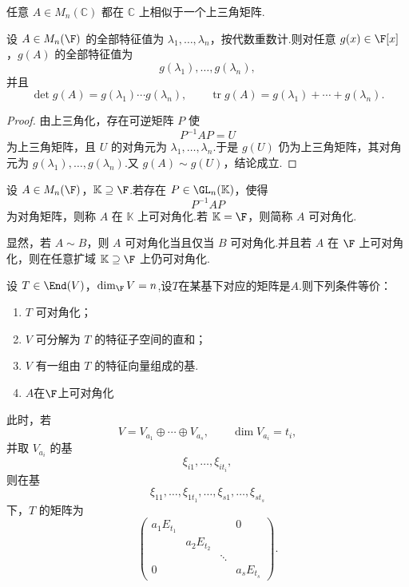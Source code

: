 \begin{corollary}\label{相似于一个上三角矩阵.}
	任意 $A\in M_n(\mathbb C)$ 都在 $\mathbb C$ 上相似于一个上三角矩阵.
\end{corollary}

\begin{corollary}
	设 $A\in M_n(\F)$ 的全部特征值为 $\lambda_1,\ldots,\lambda_n$，按代数重数计.则对任意 $g(x)\in\F[x]$，$g(A)$ 的全部特征值为
	\[
	g(\lambda_1),\ldots,g(\lambda_n),
	\]
	并且
	\[
	\det g(A)=g(\lambda_1)\cdots g(\lambda_n),
	\qquad
	\operatorname{tr} g(A)=g(\lambda_1)+\cdots+g(\lambda_n).
	\]
\end{corollary}

\begin{proof}
	由上三角化，存在可逆矩阵 $P$ 使
	\[
	P^{-1}AP=U
	\]
	为上三角矩阵，且 $U$ 的对角元为 $\lambda_1,\ldots,\lambda_n$.于是 $g(U)$ 仍为上三角矩阵，其对角元为 $g(\lambda_1),\ldots,g(\lambda_n)$.又 $g(A)\sim g(U)$，结论成立.
\end{proof}

\begin{definition}
	设 $A\in M_n(\F)$，$\mathbb K\supseteq\F$.若存在 $P\in \GL_n(\mathbb K)$，使得
	\[
	P^{-1}AP
	\]
	为对角矩阵，则称 $A$ 在 $\mathbb K$ 上可对角化.若 $\mathbb K=\F$，则简称 $A$ 可对角化.
\end{definition}

显然，若 $A\sim B$，则 $A$ 可对角化当且仅当 $B$ 可对角化.并且若 $A$ 在 $\F$ 上可对角化，则在任意扩域 $\mathbb K\supseteq\F$ 上仍可对角化.


	设 $T\in\End(V)$，$\dim_{\F}V=n$,设$T$在某基下对应的矩阵是$A$.则下列条件等价：
	\begin{enumerate}
		\item $T$ 可对角化；
		\item $V$ 可分解为 $T$ 的特征子空间的直和；
		\item $V$ 有一组由 $T$ 的特征向量组成的基.
		\item $A$在$\F$上可对角化
	\end{enumerate}
	此时，若
	\[
	V=V_{a_1}\oplus\cdots\oplus V_{a_s},
	\qquad \dim V_{a_i}=t_i,
	\]
	并取 $V_{a_i}$ 的基
	\[
	\xi_{i1},\ldots,\xi_{it_i},
	\]
	则在基
	\[
	\xi_{11},\ldots,\xi_{1t_1},\ldots,
	\xi_{s1},\ldots,\xi_{st_s}
	\]
	下，$T$ 的矩阵为
	\[
	\begin{pmatrix}
		a_1E_{t_1}&&&0\\
		&a_2E_{t_2}&&\\
		&&\ddots&\\
		0&&&a_sE_{t_s}
	\end{pmatrix}.
	\]

